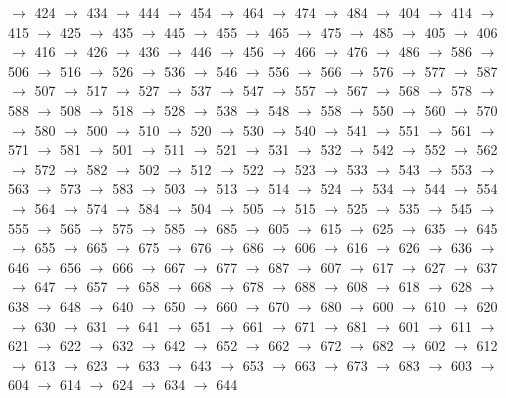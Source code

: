 $\rightarrow$ 424 $\rightarrow$ 434 $\rightarrow$ 444 $\rightarrow$ 454 $\rightarrow$ 464 $\rightarrow$ 474 $\rightarrow$ 484 $\rightarrow$ 404 $\rightarrow$ 414 $\rightarrow$ 415 $\rightarrow$ 425 $\rightarrow$ 435 $\rightarrow$ 445 $\rightarrow$ 455 $\rightarrow$ 465 $\rightarrow$ 475 $\rightarrow$ 485 $\rightarrow$ 405 $\rightarrow$ 406 $\rightarrow$ 416 $\rightarrow$ 426 $\rightarrow$ 436 $\rightarrow$ 446 $\rightarrow$ 456 $\rightarrow$ 466 $\rightarrow$ 476 $\rightarrow$ 486 $\rightarrow$ 586 $\rightarrow$ 506 $\rightarrow$ 516 $\rightarrow$ 526 $\rightarrow$ 536 $\rightarrow$ 546 $\rightarrow$ 556 $\rightarrow$ 566 $\rightarrow$ 576 $\rightarrow$ 577 $\rightarrow$ 587 $\rightarrow$ 507 $\rightarrow$ 517 $\rightarrow$ 527 $\rightarrow$ 537 $\rightarrow$ 547 $\rightarrow$ 557 $\rightarrow$ 567 $\rightarrow$ 568 $\rightarrow$ 578 $\rightarrow$ 588 $\rightarrow$ 508 $\rightarrow$ 518 $\rightarrow$ 528 $\rightarrow$ 538 $\rightarrow$ 548 $\rightarrow$ 558 $\rightarrow$ 550 $\rightarrow$ 560 $\rightarrow$ 570 $\rightarrow$ 580 $\rightarrow$ 500 $\rightarrow$ 510 $\rightarrow$ 520 $\rightarrow$ 530 $\rightarrow$ 540 $\rightarrow$ 541 $\rightarrow$ 551 $\rightarrow$ 561 $\rightarrow$ 571 $\rightarrow$ 581 $\rightarrow$ 501 $\rightarrow$ 511 $\rightarrow$ 521 $\rightarrow$ 531 $\rightarrow$ 532 $\rightarrow$ 542 $\rightarrow$ 552 $\rightarrow$ 562 $\rightarrow$ 572 $\rightarrow$ 582 $\rightarrow$ 502 $\rightarrow$ 512 $\rightarrow$ 522 $\rightarrow$ 523 $\rightarrow$ 533 $\rightarrow$ 543 $\rightarrow$ 553 $\rightarrow$ 563 $\rightarrow$ 573 $\rightarrow$ 583 $\rightarrow$ 503 $\rightarrow$ 513 $\rightarrow$ 514 $\rightarrow$ 524 $\rightarrow$ 534 $\rightarrow$ 544 $\rightarrow$ 554 $\rightarrow$ 564 $\rightarrow$ 574 $\rightarrow$ 584 $\rightarrow$ 504 $\rightarrow$ 505 $\rightarrow$ 515 $\rightarrow$ 525 $\rightarrow$ 535 $\rightarrow$ 545 $\rightarrow$ 555 $\rightarrow$ 565 $\rightarrow$ 575 $\rightarrow$ 585 $\rightarrow$ 685 $\rightarrow$ 605 $\rightarrow$ 615 $\rightarrow$ 625 $\rightarrow$ 635 $\rightarrow$ 645 $\rightarrow$ 655 $\rightarrow$ 665 $\rightarrow$ 675 $\rightarrow$ 676 $\rightarrow$ 686 $\rightarrow$ 606 $\rightarrow$ 616 $\rightarrow$ 626 $\rightarrow$ 636 $\rightarrow$ 646 $\rightarrow$ 656 $\rightarrow$ 666 $\rightarrow$ 667 $\rightarrow$ 677 $\rightarrow$ 687 $\rightarrow$ 607 $\rightarrow$ 617 $\rightarrow$ 627 $\rightarrow$ 637 $\rightarrow$ 647 $\rightarrow$ 657 $\rightarrow$ 658 $\rightarrow$ 668 $\rightarrow$ 678 $\rightarrow$ 688 $\rightarrow$ 608 $\rightarrow$ 618 $\rightarrow$ 628 $\rightarrow$ 638 $\rightarrow$ 648 $\rightarrow$ 640 $\rightarrow$ 650 $\rightarrow$ 660 $\rightarrow$ 670 $\rightarrow$ 680 $\rightarrow$ 600 $\rightarrow$ 610 $\rightarrow$ 620 $\rightarrow$ 630 $\rightarrow$ 631 $\rightarrow$ 641 $\rightarrow$ 651 $\rightarrow$ 661 $\rightarrow$ 671 $\rightarrow$ 681 $\rightarrow$ 601 $\rightarrow$ 611 $\rightarrow$ 621 $\rightarrow$ 622 $\rightarrow$ 632 $\rightarrow$ 642 $\rightarrow$ 652 $\rightarrow$ 662 $\rightarrow$ 672 $\rightarrow$ 682 $\rightarrow$ 602 $\rightarrow$ 612 $\rightarrow$ 613 $\rightarrow$ 623 $\rightarrow$ 633 $\rightarrow$ 643 $\rightarrow$ 653 $\rightarrow$ 663 $\rightarrow$ 673 $\rightarrow$ 683 $\rightarrow$ 603 $\rightarrow$ 604 $\rightarrow$ 614 $\rightarrow$ 624 $\rightarrow$ 634 $\rightarrow$ 644 